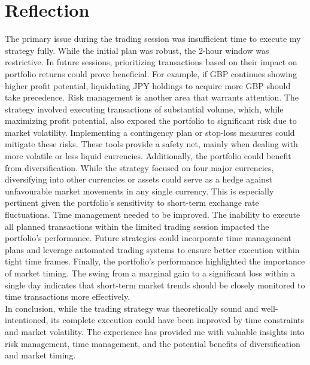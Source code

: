\documentclass{article}
\begin{document}
\section*{Reflection}
The primary issue during the trading session was insufficient time to execute my strategy fully. While the initial plan was robust, the 2-hour window was restrictive. In future sessions, prioritizing transactions based on their impact on portfolio returns could prove beneficial. For example, if GBP continues showing higher profit potential, liquidating JPY holdings to acquire more GBP should take precedence.
Risk management is another area that warrants attention. The strategy involved executing transactions of substantial volume, which, while maximizing profit potential, also exposed the portfolio to significant risk due to market volatility. Implementing a contingency plan or stop-loss measures could mitigate these risks. These tools provide a safety net, mainly when dealing with more volatile or less liquid currencies.
Additionally, the portfolio could benefit from diversification. While the strategy focused on four major currencies, diversifying into other currencies or assets could serve as a hedge against unfavourable market movements in any single currency. This is especially pertinent given the portfolio's sensitivity to short-term exchange rate fluctuations.
Time management needed to be improved. The inability to execute all planned transactions within the limited trading session impacted the portfolio's performance. Future strategies could incorporate time management plans and leverage automated trading systems to ensure better execution within tight time frames.
Finally, the portfolio's performance highlighted the importance of market timing. The swing from a marginal gain to a significant loss within a single day indicates that short-term market trends should be closely monitored to time transactions more effectively.\\

\noindent In conclusion, while the trading strategy was theoretically sound and well-intentioned, its complete execution could have been improved by time constraints and market volatility. The experience has provided me with valuable insights into risk management, time management, and the potential benefits of diversification and market timing.
\end{document}
